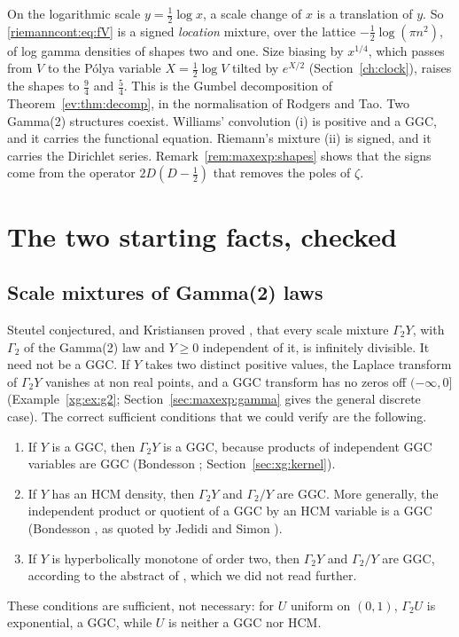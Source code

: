 On the logarithmic scale $y=\frac12\log x$, a scale change of $x$ is a translation of $y$. So \eqref{riemanncont:eq:fV} is a signed \emph{location} mixture, over the lattice $-\frac12\log(\pi n^2)$, of log gamma densities of shapes two and one. Size biasing by $x^{1/4}$, which passes from $V$ to the P\'olya variable $X=\frac12\log V$ tilted by $e^{X/2}$ (Section~\ref{ch:clock}), raises the shapes to $\frac94$ and $\frac54$. This is the Gumbel decomposition of Theorem~\ref{ev:thm:decomp}, in the normalisation of Rodgers and Tao. Two Gamma(2) structures coexist. Williams' convolution (i) is positive and a GGC, and it carries the functional equation. Riemann's mixture (ii) is signed, and it carries the Dirichlet series. Remark~\ref{rem:maxexp:shapes} shows that the signs come from the operator $2D(D-\frac12)$ that removes the poles of $\zeta$.

\section{The two starting facts, checked}\label{riemanncont:sec:closure}

\subsection{Scale mixtures of Gamma(2) laws}

Steutel conjectured, and Kristiansen proved \cite{Kristiansen94}, that every scale mixture $\Gamma_2Y$, with $\Gamma_2$ of the Gamma(2) law and $Y\ge0$ independent of it, is infinitely divisible. It need not be a GGC. If $Y$ takes two distinct positive values, the Laplace transform of $\Gamma_2Y$ vanishes at non real points, and a GGC transform has no zeros off $(-\infty,0]$ (Example~\ref{xg:ex:g2}; Section~\ref{sec:maxexp:gamma} gives the general discrete case). The correct sufficient conditions that we could verify are the following.
\begin{enumerate}
\item If $Y$ is a GGC, then $\Gamma_2Y$ is a GGC, because products of independent GGC variables are GGC (Bondesson \cite{Bond2015}; Section~\ref{sec:xg:kernel}).
\item If $Y$ has an HCM density, then $\Gamma_2Y$ and $\Gamma_2/Y$ are GGC. More generally, the independent product or quotient of a GGC by an HCM variable is a GGC (Bondesson \cite[Theorem 6.2.1]{Bondesson}, as quoted by Jedidi and Simon \cite{NCJedidiSimon13}).
\item If $Y$ is hyperbolically monotone of order two, then $\Gamma_2Y$ and $\Gamma_2/Y$ are GGC, according to the abstract of \cite{NCSjodin19}, which we did not read further.
\end{enumerate}
These conditions are sufficient, not necessary: for $U$ uniform on $(0,1)$, $\Gamma_2U$ is exponential, a GGC, while $U$ is neither a GGC nor HCM.

